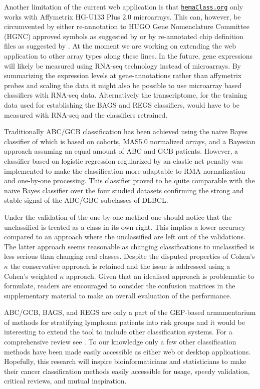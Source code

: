 \documentclass[10pt,letterpaper]{article}
\newcommand{\hemaClass}{\href{http://hemaClass.org}{\texttt{hemaClass.org}}}
\begin{document}
Another limitation of the current web application is that \hemaClass{} only works with Affymetrix HG-U133 Plus 2.0 microarrays. This can, however, be circumvented by either re-annotation to HUGO Gene Nomenclature Committee (HGNC) approved symbols as suggested by \cite{Care2013} or by re-annotated chip definition files as suggested by \cite{Dai2005}. At the moment we are working on extending the web application to other array types along these lines. In the future, gene expressions will likely be measured using RNA-seq technology instead of microarrays. By summarizing the expression levels at gene-annotations rather than affymetrix probes and scaling the data it might also be possible to use microarray based classifiers with RNA-seq data. Alternatively the transcriptome, for the training data used for establishing the BAGS and REGS classifiers, would have to be measured with RNA-seq and the classifiers retrained.

Traditionally ABC/GCB classification has been achieved using the naive Bayes classifier of \cite{Wright2003} which is based on cohorts, MAS5.0 normalized arrays, and a Bayesian approach assuming an equal amount of ABC and GCB patients.
However, a classifier based on logistic regression regularized by an elastic net penalty was implemented to make the classification more adaptable to RMA normalization and one-by-one processing.
This classifier proved to be quite comparable with the naive Bayes classifier over the four studied datasets confirming the strong and stable signal of the ABC/GBC subclasses of DLBCL.

Under the validation of the one-by-one method one should notice that the unclassified is treated as a class in its own right.
This implies a lower accuracy compared to an approach where the unclassified are left out of the validations.
The latter approach seems reasonable as changing classifications to unclassified is less serious than changing real classes.
Despite the disputed properties of Cohen's $\kappa$ the conservative approach is retained and the issue is addressed using a Cohen's weighted $\kappa$ approach.
Given that an idealised approach is problematic to formulate, readers are encouraged to consider the confusion matrices in the supplementary material to make an overall evaluation of the performance.

ABC/GCB, BAGS, and REGS are only a part of the GEP-based armamentarium of methods for stratifying lymphoma patients into risk groups \cite{Shipp2002, Lossos2004a, Malumbres2008} and it would be interesting to extend the tool to include other classification systems.
For a comprehensive review see \cite{Coutinho2013}.
To our knowledge only a few other classification methods have been made easily accessible as either web or desktop applications.
Hopefully, this research will inspire bioinformaticians and statisticians to make their cancer classification methods easily accessible for usage, speedy validation, critical reviews, and mutual inspiration.
\end{document}
